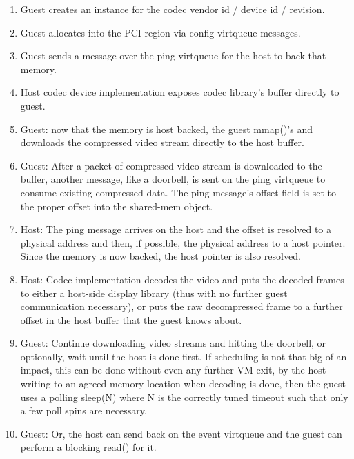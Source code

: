 \begin{enumerate}

\item Guest creates an instance for the codec vendor id / device id / revision.

\item Guest allocates into the PCI region via config virtqueue messages.

\item Guest sends a message over the ping virtqueue for the host to back that memory.

\item Host codec device implementation exposes codec library's buffer directly to guest.

\item Guest: now that the memory is host backed, the guest mmap()'s and
    downloads the compressed video stream directly to the host buffer.

\item Guest: After a packet of compressed video stream is downloaded to the
    buffer, another message, like a doorbell, is sent on the ping virtqueue to
        consume existing compressed data. The ping message's offset field is
        set to the proper offset into the shared-mem object.

\item Host: The ping message arrives on the host and the offset is resolved to
    a physical address and then, if possible, the physical address to a host
        pointer. Since the memory is now backed, the host pointer is also
        resolved.

\item Host: Codec implementation decodes the video and puts the decoded frames
    to either a host-side display library (thus with no further guest
        communication necessary), or puts the raw decompressed frame to a
        further offset in the host buffer that the guest knows about.

\item Guest: Continue downloading video streams and hitting the doorbell, or
    optionally, wait until the host is done first. If scheduling is not that
        big of an impact, this can be done without even any further VM exit, by
        the host writing to an agreed memory location when decoding is done,
        then the guest uses a polling sleep(N) where N is the correctly tuned
        timeout such that only a few poll spins are necessary.

\item Guest: Or, the host can send back on the event virtqueue 
    and the guest can perform a blocking read() for it.

\end{enumerate}

